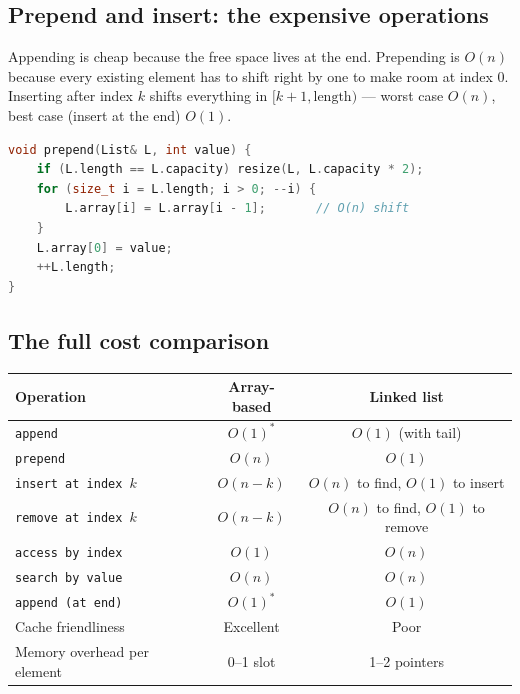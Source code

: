 \documentclass[11pt]{article}
\begin{document}
\subsection*{Prepend and insert: the expensive operations}

Appending is cheap because the free space lives at the end.
Prepending is \textbf{$O(n)$} because every existing element has
to shift right by one to make room at index 0. Inserting after
index $k$ shifts everything in $[k+1, \text{length})$ --- worst
case $O(n)$, best case (insert at the end) $O(1)$.

\begin{examplebox}
\begin{lstlisting}[language=C++,basicstyle=\ttfamily\small,frame=single]
void prepend(List& L, int value) {
    if (L.length == L.capacity) resize(L, L.capacity * 2);
    for (size_t i = L.length; i > 0; --i) {
        L.array[i] = L.array[i - 1];       // O(n) shift
    }
    L.array[0] = value;
    ++L.length;
}
\end{lstlisting}
\end{examplebox}

\subsection*{The full cost comparison}

\begin{center}
\begin{tabular}{|l|c|c|}
\hline
\textbf{Operation} & \textbf{Array-based} & \textbf{Linked list} \\
\hline
\texttt{append}                 & $O(1)^*$ & $O(1)$ (with tail) \\
\texttt{prepend}                & $O(n)$   & $O(1)$ \\
\texttt{insert at index $k$}    & $O(n-k)$ & $O(n)$ to find, $O(1)$ to insert \\
\texttt{remove at index $k$}    & $O(n-k)$ & $O(n)$ to find, $O(1)$ to remove \\
\texttt{access by index}        & $O(1)$   & $O(n)$ \\
\texttt{search by value}        & $O(n)$   & $O(n)$ \\
\texttt{append (at end)}        & $O(1)^*$ & $O(1)$ \\
Cache friendliness              & Excellent & Poor \\
Memory overhead per element     & 0--1 slot  & 1--2 pointers \\
\hline
\end{tabular}
\end{center}
\end{document}
